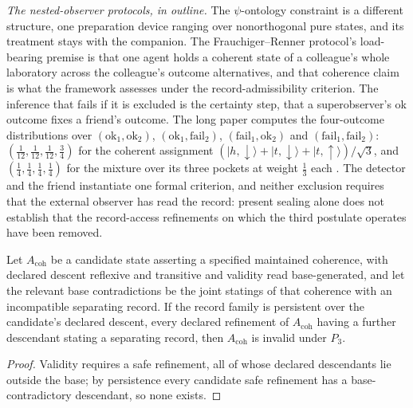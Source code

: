 \emph{The nested-observer protocols, in outline.} The $\psi$-ontology constraint is a different structure, one preparation device ranging over nonorthogonal pure states, and its treatment stays with the companion. The Frauchiger--Renner protocol's load-bearing premise is that one agent holds a coherent state of a colleague's whole laboratory across the colleague's outcome alternatives, and that coherence claim is what the framework assesses under the record-admissibility criterion. The inference that fails if it is excluded is the certainty step, that a superobserver's ok outcome fixes a friend's outcome. The long paper computes the four-outcome distributions over $(\mathrm{ok}_1, \mathrm{ok}_2)$, $(\mathrm{ok}_1, \mathrm{fail}_2)$, $(\mathrm{fail}_1, \mathrm{ok}_2)$ and $(\mathrm{fail}_1, \mathrm{fail}_2)$: $(\tfrac{1}{12}, \tfrac{1}{12}, \tfrac{1}{12}, \tfrac34)$ for the coherent assignment $(|h,{\downarrow}\rangle + |t,{\downarrow}\rangle + |t,{\uparrow}\rangle)/\sqrt 3$, and $(\tfrac14, \tfrac14, \tfrac14, \tfrac14)$ for the mixture over its three pockets at weight $\tfrac13$ each \cite{Aethus}. The detector and the friend instantiate one formal criterion, and neither exclusion requires that the external observer has read the record: present sealing alone does not establish that the record-access refinements on which the third postulate operates have been removed.
\begin{lemma}\label{lem:record-exclusion-q}
Let $A_{\mathrm{coh}}$ be a candidate state asserting a specified maintained coherence, with declared descent reflexive and transitive and validity read base-generated, and let the relevant base contradictions be the joint statings of that coherence with an incompatible separating record. If the record family is persistent over the candidate's declared descent, every declared refinement of $A_{\mathrm{coh}}$ having a further descendant stating a separating record, then $A_{\mathrm{coh}}$ is invalid under $P_3$.
\end{lemma}
\begin{proof}
Validity requires a safe refinement, all of whose declared descendants lie outside the base; by persistence every candidate safe refinement has a base-contradictory descendant, so none exists.
\end{proof}

